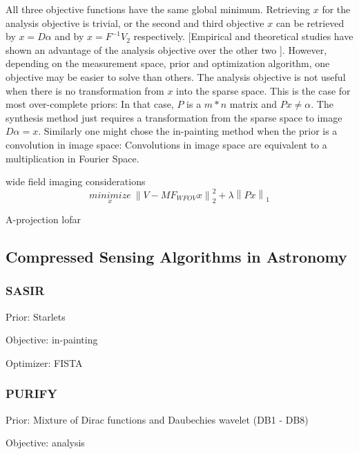 All three objective functions have the same global minimum. Retrieving $x$ for the analysis objective is trivial, or the second and third objective $x$ can be retrieved by $x = D\alpha$ and by $x = F^{-1}V_2$ respectively. [Empirical and theoretical studies have shown an advantage of the analysis objective over the other two \cite{something}]. However, depending on the measurement space, prior and optimization algorithm, one objective may be easier to solve than others. The analysis objective is not useful when there is no transformation from $x$ into the sparse space. This is the case for most over-complete priors: In that case, $P$ is a $m*n$ matrix and  $Px \ne \alpha$. The synthesis method just requires a transformation from the sparse space to image $D\alpha = x$. Similarly one might chose the in-painting method when the prior is a convolution in image space: Convolutions in image space are equivalent to a multiplication in Fourier Space.

wide field imaging considerations
\begin{equation}\label{cs:eq:wfield}
	\underset{x}{minimize} \: \left \| V - MF_{WFOV} x \right \|_2^2 + \lambda \left \| Px\right \|_1
\end{equation}

A-projection lofar \cite{tasse2013applying}



\subsection{Compressed Sensing Algorithms in Astronomy}



\subsubsection{SASIR}
Prior: Starlets

Objective: in-painting

Optimizer: FISTA


\subsubsection{PURIFY}
Prior: Mixture of Dirac functions and Daubechies wavelet (DB1 - DB8)

Objective: analysis

